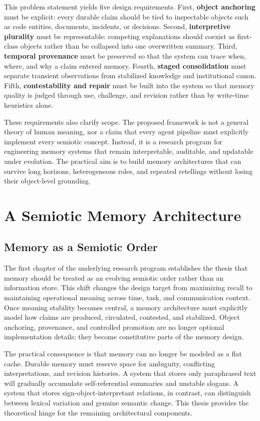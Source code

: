 \documentclass[11pt]{article}
\begin{document}
This problem statement yields five design requirements. First, \textbf{object anchoring} must be explicit: every durable claim should be tied to inspectable objects such as code entities, documents, incidents, or decisions. Second, \textbf{interpretive plurality} must be representable: competing explanations should coexist as first-class objects rather than be collapsed into one overwritten summary. Third, \textbf{temporal provenance} must be preserved so that the system can trace when, where, and why a claim entered memory. Fourth, \textbf{staged consolidation} must separate transient observations from stabilized knowledge and institutional canon. Fifth, \textbf{contestability and repair} must be built into the system so that memory quality is judged through use, challenge, and revision rather than by write-time heuristics alone.

These requirements also clarify scope. The proposed framework is not a general theory of human meaning, nor a claim that every agent pipeline must explicitly implement every semiotic concept. Instead, it is a research program for engineering memory systems that remain interpretable, auditable, and updatable under evolution. The practical aim is to build memory architectures that can survive long horizons, heterogeneous roles, and repeated retellings without losing their object-level grounding.

\section{A Semiotic Memory Architecture}
\label{sec:architecture}

\subsection{Memory as a Semiotic Order}

The first chapter of the underlying research program establishes the thesis that memory should be treated as an evolving semiotic order rather than an information store. This shift changes the design target from maximizing recall to maintaining operational meaning across time, task, and communication context. Once meaning stability becomes central, a memory architecture must explicitly model how claims are produced, circulated, contested, and stabilized. Object anchoring, provenance, and controlled promotion are no longer optional implementation details; they become constitutive parts of the memory design.

The practical consequence is that memory can no longer be modeled as a flat cache. Durable memory must reserve space for ambiguity, conflicting interpretations, and revision histories. A system that stores only paraphrased text will gradually accumulate self-referential summaries and unstable slogans. A system that stores sign-object-interpretant relations, in contrast, can distinguish between lexical variation and genuine semantic change. This thesis provides the theoretical hinge for the remaining architectural components.
\end{document}
